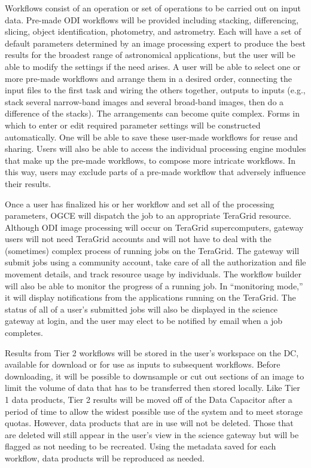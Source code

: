 \documentclass[10pt,conference]{IEEEtran}
\begin{document}
Workflows consist of an operation or set of operations to be carried out on input data. Pre-made ODI workflows will be provided including stacking, differencing, slicing, object identification, photometry, and astrometry. Each will have a set of default parameters determined by an image processing expert to produce the best results for the broadest range of astronomical applications, but the user will be able to modify the settings if the need arises. A user will be able to select one or more pre-made workflows and arrange them in a desired order, connecting the input files to the first task and wiring the others together, outputs to inputs (e.g., stack several narrow-band images and several broad-band images, then do a difference of the stacks). The arrangements can become quite complex. Forms in which to enter or edit required parameter settings will be constructed automatically. One will be able to save these user-made workflows for reuse and sharing.  Users will also be able to access the individual processing engine modules that make up the pre-made workflows, to compose more intricate workflows. In this way, users may exclude parts of a pre-made workflow that adversely influence their results.

Once a user has finalized his or her workflow and set all of the processing parameters, OGCE will dispatch the job to an appropriate TeraGrid resource. Although ODI image processing will occur on TeraGrid supercomputers, gateway users will not need TeraGrid accounts and will not have to deal with the (sometimes) complex process of running jobs on the TeraGrid. The gateway will submit jobs using a community account, take care of all the authorization and file movement details, and track resource usage by individuals. The workflow builder will also be able to monitor the progress of a running job. In ``monitoring mode,'' it will display notifications from the applications running on the TeraGrid. The status of all of a user's submitted jobs will also be displayed in the science gateway at login, and the user may elect to be notified by email when a job completes. 
 
Results from Tier 2 workflows will be stored in the user's workspace on the DC, available for download or for use as inputs to subsequent workflows. Before downloading, it will be possible to downsample or cut out sections of an image to limit the volume of data that has to be transferred then stored locally. Like Tier 1 data products, Tier 2 results will be moved off of the Data Capacitor after a period of time to allow the widest possible use of the system and to meet storage quotas. However, data products that are in use will not be deleted. Those that are deleted will still appear in the user's view in the science gateway but will be flagged as not needing to be recreated. Using the metadata saved for each workflow, data products will be reproduced as needed.
\end{document}
